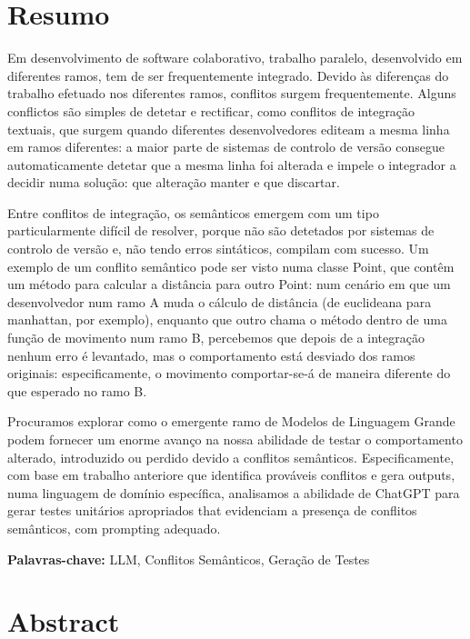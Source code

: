 \chapter*{Resumo}

Em desenvolvimento de software colaborativo, trabalho paralelo, desenvolvido em diferentes ramos, tem de ser frequentemente integrado. Devido às diferenças do trabalho efetuado nos diferentes ramos, conflitos surgem frequentemente. Alguns conflictos são simples de detetar e rectificar, como conflitos de integração textuais, que surgem quando diferentes desenvolvedores editeam a mesma linha em ramos diferentes: a maior parte de sistemas de controlo de versão consegue automaticamente detetar que a mesma linha foi alterada e impele o integrador a decidir numa solução: que alteração manter e que discartar.

Entre conflitos de integração, os semânticos emergem com um tipo particularmente difícil de resolver, porque não são detetados por sistemas de controlo de versão e, não tendo erros sintáticos, compilam com sucesso. Um exemplo de um conflito semântico pode ser visto numa classe Point, que contêm um método para calcular a distância para outro Point: num cenário em que um desenvolvedor num ramo A muda o cálculo de distância (de euclideana para manhattan, por exemplo), enquanto que outro chama o método dentro de uma função de movimento num ramo B, percebemos que depois de a integração nenhum erro é levantado, mas o comportamento está desviado dos ramos originais: especificamente, o movimento comportar-se-á de maneira diferente do que esperado no ramo B.

Procuramos explorar como o emergente ramo de Modelos de Linguagem Grande podem fornecer um enorme avanço na nossa abilidade de testar o comportamento alterado, introduzido ou perdido devido a conflitos semânticos.
Especificamente, com base em trabalho anteriore que identifica prováveis conflitos e gera outputs, numa linguagem de domínio específica, analisamos a abilidade de ChatGPT para gerar testes unitários apropriados that evidenciam a presença de conflitos semânticos, com prompting adequado.

\bigskip\noindent
\textbf{Palavras-chave:} LLM, Conflitos Semânticos, Geração de Testes


\chapter*{Abstract}


